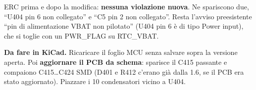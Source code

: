 ERC prima e dopo la modifica: \textbf{nessuna violazione nuova}. Ne spariscono due, \textquotedblleft{}U404 pin 6 non collegato\textquotedblright{} e \textquotedblleft{}C5 pin 2 non collegato\textquotedblright{}. Resta l'avviso preesistente \textquotedblleft{}pin di alimentazione VBAT non pilotato\textquotedblright{} (U404 pin 6 è di tipo Power input), che si toglie con un PWR\_\allowbreak{}FLAG su RTC\_\allowbreak{}VBAT.

\begin{notebox}
\textbf{Da fare in KiCad.} Ricaricare il foglio MCU senza salvare sopra la versione aperta. Poi \textbf{aggiornare il PCB da schema}: sparisce il C415 passante e compaiono C415…C424 SMD (D401 e R412 c'erano già dalla 1.6, se il PCB era stato aggiornato). Piazzare i 10 condensatori vicino a U404.
\end{notebox}

